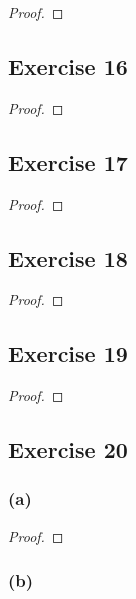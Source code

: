 \documentclass[14pt]{extarticle}
\begin{document}
\begin{proof}

\end{proof}

\subsection{Exercise 16}

\begin{proof}

\end{proof}

\subsection{Exercise 17}

\begin{proof}

\end{proof}

\subsection{Exercise 18}

\begin{proof}

\end{proof}

\subsection{Exercise 19}

\begin{proof}

\end{proof}

\subsection{Exercise 20}

\subsubsection{(a)}

\begin{proof}

\end{proof}

\subsubsection{(b)}
\end{document}
